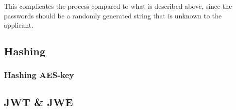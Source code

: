 This complicates the process compared to what is described above, since
the passwords should be a randomly generated string that is unknown to the
applicant.


\subsection{Hashing}\label{subsec:hashing}

\subsubsection{Hashing AES-key}\label{subsubsec:hashing-aes-key}


\subsection{JWT \& JWE}\label{subsec:jwt}



%






